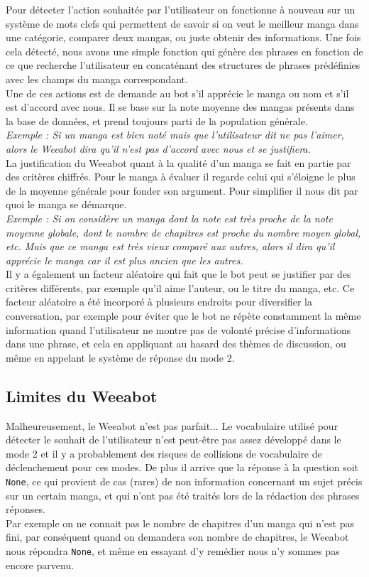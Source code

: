 \documentclass[paper=a4, fontsize=11pt]{article}
\begin{document}
Pour détecter l’action souhaitée par l’utilisateur on fonctionne à nouveau sur un système de mots clefs qui permettent de savoir si on veut le meilleur manga dans une catégorie, comparer deux mangas, ou juste obtenir des informations. Une fois cela détecté, nous avons une simple fonction qui génère des phrases en fonction de ce que recherche l’utilisateur en concaténant des structures de phrases prédéfinies avec les champs du manga correspondant. \\
Une de ces actions est de demande au bot s’il apprécie le manga ou nom et s’il est d’accord avec nous. Il se base sur la note moyenne des mangas présents dans la base de données, et prend toujours parti de la population générale.\\
\textit{Exemple : Si un manga est bien noté mais que l’utilisateur dit ne pas l’aimer, alors le Weeabot dira qu’il n’est pas d’accord avec nous et se justifiera.} \\
La justification du Weeabot quant à la qualité d’un manga se fait en partie par des critères chiffrés. Pour le manga à évaluer il regarde celui qui s’éloigne le plus de la moyenne générale pour fonder son argument. Pour simplifier il nous dit par quoi le manga se démarque. \\

\textit{Exemple : Si on considère un manga dont la note est très proche de la note moyenne globale, dont le nombre de chapitres est proche du nombre moyen global, etc. Mais que ce manga est très vieux comparé aux autres, alors il dira qu’il apprécie le manga car il est plus ancien que les autres.} \\
Il y a également un facteur aléatoire qui fait que le bot peut se justifier par des critères différents, par exemple qu’il aime l’auteur, ou le titre du manga, etc.
Ce facteur aléatoire a été incorporé à plusieurs endroits pour diversifier la conversation, par exemple pour éviter que le bot ne répète constamment la même information quand l’utilisateur ne montre pas de volonté précise d’informations dans une phrase, et cela en appliquant au hasard des thèmes de discussion, ou même en appelant le système de réponse du mode 2. \\

\subsection{Limites du Weeabot}
Malheureusement, le Weeabot n'est pas parfait...
Le vocabulaire utilisé pour détecter le souhait de l’utilisateur n’est peut-être pas assez développé dans le mode 2 et il y a probablement des risques de collisions de vocabulaire de déclenchement pour ces modes. De plus il arrive que la réponse à la question soit \texttt{None}, ce qui provient de cas (rares) de non information concernant un sujet précis sur un certain manga, et qui n’ont pas été traités lors de la rédaction des phrases réponses.\\
Par exemple on ne connait pas le nombre de chapitres d'un manga qui n'est pas fini, par conséquent quand on demandera son nombre de chapitres, le Weeabot nous répondra \texttt{None}, et même en essayant d'y remédier nous n'y sommes pas encore parvenu. \\
\end{document}
